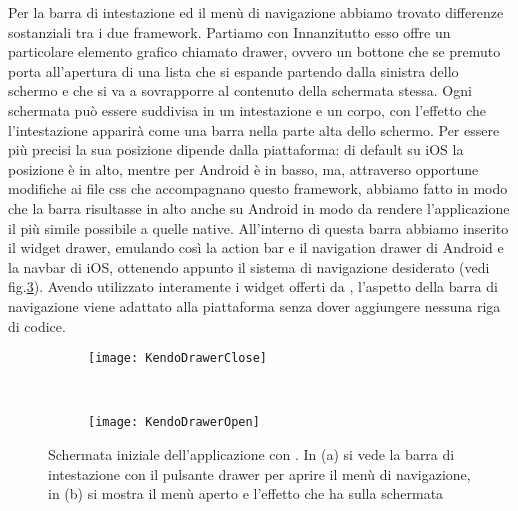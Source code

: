 			Per la barra di intestazione ed il menù di navigazione abbiamo trovato 
			differenze sostanziali tra i due framework.
			Partiamo con \kendomob{}
			Innanzitutto esso offre un particolare elemento grafico chiamato drawer, 
			ovvero un bottone che se premuto porta all'apertura di 
			una lista che si espande partendo dalla sinistra dello schermo e che 
			si va a sovrapporre al contenuto della schermata stessa.
			Ogni schermata può essere suddivisa in un intestazione e un corpo, 
			con l'effetto che l'intestazione apparirà come una barra nella parte alta 
			dello schermo. Per essere più precisi la sua posizione dipende dalla
			piattaforma: di default su iOS la posizione è in alto, mentre per Android 
			è in basso, ma, attraverso opportune modifiche ai file css che accompagnano 
			questo framework, abbiamo fatto in modo che la barra risultasse in alto 
			anche su Android in modo da rendere l'applicazione il più simile possibile 
			a quelle native.
			All'interno di questa barra abbiamo inserito il widget drawer, emulando 
			così la action bar e il navigation drawer di Android e la navbar di iOS,
			ottenendo appunto il sistema di navigazione desiderato (vedi fig.\ref{fig:kendodrawer}).
			Avendo utilizzato interamente i widget offerti da \kendomob{}, l'aspetto 
			della barra di navigazione viene adattato alla piattaforma senza 
			dover aggiungere nessuna riga di codice.
			\begin{figure}[h]
				\centering
				\begin{subfigure}[b]{0.485\textwidth}
					\texttt{[image: KendoDrawerClose]}
					\caption{}
					\label{fig:kendoDrawerClose}
				\end{subfigure}
				~
				\begin{subfigure}[b]{0.485\textwidth}
					\texttt{[image: KendoDrawerOpen]}
					\caption{}
					\label{fig:kendoDrawerOpen}
				\end{subfigure}
				\caption{Schermata iniziale dell'applicazione con \kendomob{}. 
				In (a) si vede la barra di intestazione con il pulsante drawer 
				per aprire il menù di navigazione, in (b) si mostra il menù aperto 
				e l'effetto che ha sulla schermata}
				\label{fig:kendodrawer}
			\end{figure}
		

